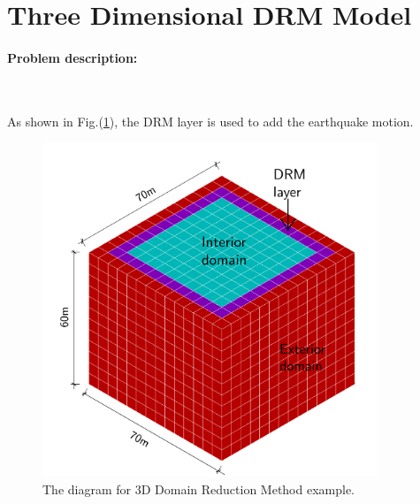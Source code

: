 \documentclass[fleqn,11pt]{article}
\begin{document}
\section{Three Dimensional DRM Model}

\paragraph{Problem description:} ~

As shown in Fig.(\ref{fig The diagram for Domain Reduction Method DRM }), the DRM layer is used to add the earthquake motion. 


\begin{figure}[!htb]
  \centering
  \includegraphics[width=10cm]{../Figure-files/_Chapter_Appendix_Illustrative_Examples/DRM_3D_descp_3.pdf}
  \caption{The diagram for 3D Domain Reduction Method example.}
  \label{fig The diagram for Domain Reduction Method DRM }
\end{figure}






\end{document}
